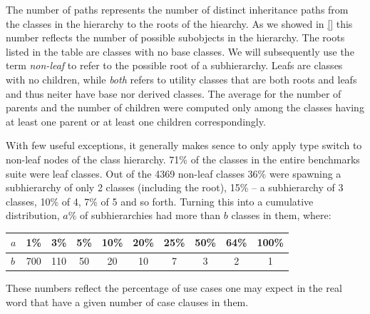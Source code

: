 The number of paths represents the number of distinct inheritance paths from the 
classes in the hierarchy to the roots of the hiearchy. As we showed in 
\textsection\ref{} this number reflects the number of possible subobjects in the 
hierarchy. The roots listed in the table are classes with no base classes. We 
will subsequently use the term \emph{non-leaf} to refer to the possible root of 
a subhierarchy. Leafs are classes with no children, while \emph{both} refers to 
utility classes that are both roots and leafs and thus neiter have base nor 
derived classes. The average for the number of parents and the number of 
children were computed only among the classes having at least one parent or at 
least one children correspondingly.

With few useful exceptions, it generally makes sence to only apply type switch 
to non-leaf nodes of the class hierarchy. 71\% of the classes in the entire 
benchmarks suite were leaf classes. Out of the 4369 non-leaf classes 36\% were 
spawning a subhierarchy of only 2 classes (including the root), 15\% -- a 
subhierarchy of 3 classes, 10\% of 4, 7\% of 5 and so forth. 
Turning this into a cumulative distribution, $a\%$ of subhierarchies had more 
than $b$ classes in them, where:

\begin{tabular}
{l||@{ }c@{ }|@{ }c@{ }|@{ }c@{ }|@{ }c@{ }|@{ }c@{ }|@{ }c@{ }|@{ }c@{ }|@{ }c@{ }|@{ }c@{ }}
$a$ & 1\% & 3\% & 5\% & 10\% & 20\% & 25\% & 50\% & 64\% & 100\% \\
\hline %
$b$ & 700 & 110 & 50  & 20   & 10   & 7    & 3    & 2    & 1
\end{tabular}


\noindent
These numbers reflect the percentage of use cases one may expect in the real 
word that have a given number of case clauses in them.

